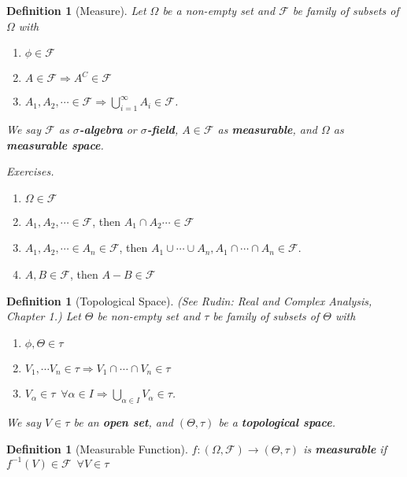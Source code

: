 \documentclass[12pt]{report}
\theoremstyle{break}
\theoremstyle{newdef}
\newtheorem{defn}[thm]{Definition} %
\theoremstyle{remark}
\begin{document}
\begin{defn}[Measure]
Let $\Omega$ be a non-empty set and $\mathcal{F}$ be family of subsets of $\Omega$ with
\begin{enumerate}
\item $\phi \in \mathcal{F}$
\item $A \in \mathcal{F} \Rightarrow A^C \in \mathcal{F}$
\item $A_1, A_2, \cdots \in \mathcal{F} \Rightarrow \bigcup_{i=1}^\infty A_i \in \mathcal{F}$.
\end{enumerate}
We say $\mathcal{F}$ as \textbf{$\sigma$-algebra} or \textbf{$\sigma$-field}, $A \in \mathcal{F}$ as \textbf{measurable}, and $\Omega$ as \textbf{measurable space}.
\end{defn}


\textit{Exercises.}
\leavevmode
\begin{enumerate}[label = \arabic*)]
\item $\Omega \in \mathcal{F}$
\item $A_1, A_2, \cdots \in \mathcal{F}$, then $A_1\cap A_2 \cdots \in \mathcal{F}$
\item $A_1, A_2, \cdots \in A_n \in \mathcal{F}$, then $A_1 \cup \cdots \cup A_n, A_1 \cap \cdots \cap A_n \in \mathcal{F}$.
\item $A, B \in \mathcal{F}$, then $A-B \in \mathcal{F}$
\end{enumerate}


\begin{defn}[Topological Space]
(See Rudin: \textit{Real and Complex Analysis, Chapter 1.})
Let $\Theta$ be non-empty set and $\tau$ be family of subsets of $\Theta$ with
\begin{enumerate}
\item $\phi, \Theta \in \tau$
\item $V_1, \cdots V_n \in \tau \Rightarrow V_1 \cap \cdots \cap V_n \in \tau$
\item $V_\alpha \in \tau \enspace \forall \alpha \in I \Rightarrow \bigcup_{\alpha\in I}V_\alpha \in \tau$.
\end{enumerate}
We say $V\in\tau$ be an \textbf{open set}, and $(\Theta,\tau)$ be a \textbf{topological space}.
\end{defn}


\begin{defn}[Measurable Function]
$f : (\Omega, \mathcal{F}) \rightarrow (\Theta, \tau)$ is \textbf{measurable} if
$f^{-1}(V) \in \mathcal{F} \enspace \forall V \in \tau$
\end{defn}
\end{document}
